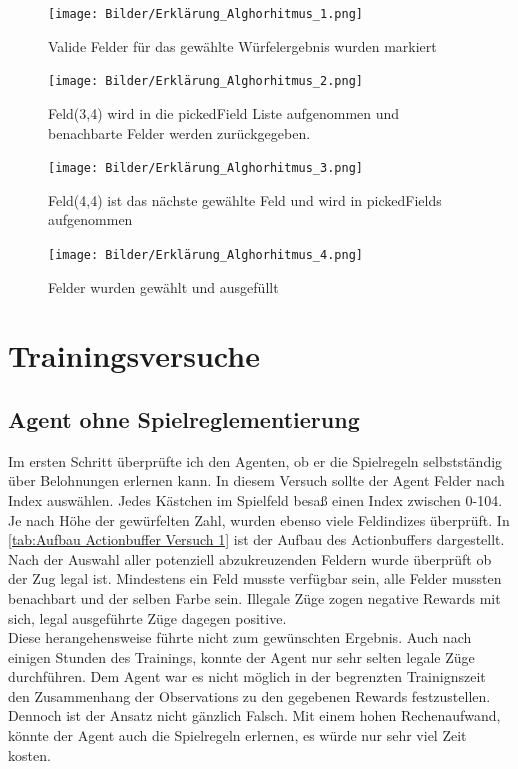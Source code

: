 \begin{figure}[!h]
	\centering
	\texttt{[image: Bilder/Erklärung\_Alghorhitmus\_1.png]}
	\caption{Valide Felder für das gewählte Würfelergebnis wurden markiert}
    \label{fig:alg1}
\end{figure}

\begin{figure}[!h]
	\centering
	\texttt{[image: Bilder/Erklärung\_Alghorhitmus\_2.png]}
	\caption{Feld(3,4) wird in die pickedField Liste aufgenommen und benachbarte Felder werden zurückgegeben.}
    \label{fig:alg2}
\end{figure}


\begin{figure}[!h]
	\centering
	\texttt{[image: Bilder/Erklärung\_Alghorhitmus\_3.png]}
	\caption{Feld(4,4) ist das nächste gewählte Feld und wird in pickedFields aufgenommen}
    \label{fig:alg3}
\end{figure}


\begin{figure}[!h]
	\centering
	\texttt{[image: Bilder/Erklärung\_Alghorhitmus\_4.png]}
	\caption{Felder wurden gewählt und ausgefüllt}
    \label{fig:alg4}
\end{figure}


\newpage


\section{Trainingsversuche}
\subsection{Agent ohne Spielreglementierung}

Im ersten Schritt überprüfte ich den Agenten, ob er die Spielregeln selbstständig über Belohnungen erlernen kann. In diesem Versuch sollte der Agent Felder nach Index auswählen.
Jedes Kästchen im Spielfeld besaß einen Index zwischen 0-104. Je nach Höhe der gewürfelten Zahl, wurden ebenso viele Feldindizes überprüft. In \ref{tab:Aufbau Actionbuffer Versuch 1} ist der Aufbau des Actionbuffers dargestellt. 
Nach der Auswahl aller potenziell abzukreuzenden Feldern wurde überprüft ob der Zug legal ist. Mindestens ein Feld musste verfügbar sein, alle Felder mussten benachbart und der selben Farbe sein. Illegale Züge zogen negative Rewards mit sich, legal ausgeführte Züge dagegen positive. \\
Diese herangehensweise führte nicht zum gewünschten Ergebnis. Auch nach einigen Stunden des Trainings, konnte der Agent nur sehr selten legale Züge durchführen. Dem Agent war es nicht möglich in der begrenzten Trainignszeit den Zusammenhang der Observations zu den gegebenen Rewards festzustellen.
Dennoch ist der Ansatz nicht gänzlich Falsch. Mit einem hohen Rechenaufwand, könnte der Agent auch die Spielregeln erlernen, es würde nur sehr viel Zeit kosten. 


